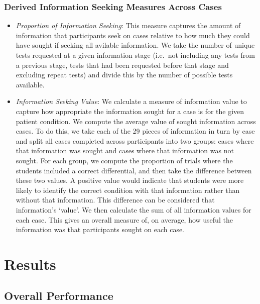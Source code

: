 \documentclass[a4paper, nobind]{templates/ociamthesis}
\begin{document}
\subsubsection{Derived Information Seeking Measures Across Cases}\label{derived-information-seeking-measures-across-cases}

\begin{itemize}
\item
  \emph{Proportion of Information Seeking}: This measure captures the amount of information that participants seek on cases relative to how much they could have sought if seeking all avilable information. We take the number of unique tests requested at a given information stage (i.e.~not including any tests from a previous stage, tests that had been requested before that stage and excluding repeat tests) and divide this by the number of possible tests available.
\item
  \emph{Information Seeking Value}: We calculate a measure of information value to capture how appropriate the information sought for a case is for the given patient condition. We compute the average value of sought information across cases. To do this, we take each of the 29 pieces of information in turn by case and split all cases completed across participants into two groups: cases where that information was sought and cases where that information was not sought. For each group, we compute the proportion of trials where the students included a correct differential, and then take the difference between these two values. A positive value would indicate that students were more likely to identify the correct condition with that information rather than without that information. This difference can be considered that information's `value'. We then calculate the sum of all information values for each case. This gives an overall measure of, on average, how useful the information was that participants sought on each case.
\end{itemize}

\section*{Results}\label{results}

\subsection*{Overall Performance}\label{overall-performance}
\end{document}
